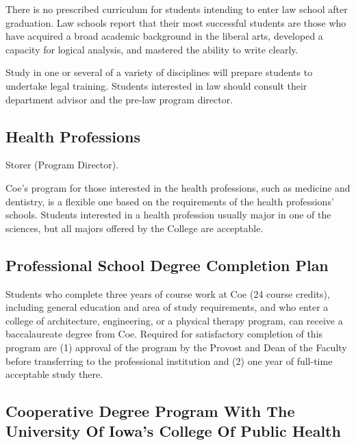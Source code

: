\documentclass[
  letterpaper,
]{scrbook}
\begin{document}
There is no prescribed curriculum for students intending to enter law
school after graduation. Law schools report that their most successful
students are those who have acquired a broad academic background in the
liberal arts, developed a capacity for logical analysis, and mastered
the ability to write clearly.

Study in one or several of a variety of disciplines will prepare
students to undertake legal training. Students interested in law should
consult their department advisor and the pre-law program director.

\hypertarget{health-professions}{%
\subsection{Health Professions}\label{health-professions}}

Storer (Program Director).

Coe's program for those interested in the health professions, such as
medicine and dentistry, is a flexible one based on the requirements of
the health professions' schools. Students interested in a health
profession usually major in one of the sciences, but all majors offered
by the College are acceptable.

\hypertarget{professional-school-degree-completion-plan}{%
\subsection{Professional School Degree Completion
Plan}\label{professional-school-degree-completion-plan}}

Students who complete three years of course work at Coe (24 course
credits), including general education and area of study requirements,
and who enter a college of architecture, engineering, or a physical
therapy program, can receive a baccalaureate degree from Coe. Required
for satisfactory completion of this program are (1) approval of the
program by the Provost and Dean of the Faculty before transferring to
the professional institution and (2) one year of full-time acceptable
study there.

\hypertarget{cooperative-degree-program-with-the-university-of-iowas-college-of-public-health}{%
\subsection{Cooperative Degree Program With The University Of Iowa's
College Of Public
Health}\label{cooperative-degree-program-with-the-university-of-iowas-college-of-public-health}}
\end{document}
